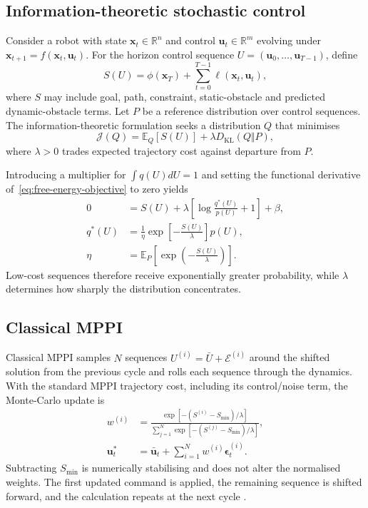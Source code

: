 \documentclass[journal]{IEEEtran}
\begin{document}
\subsection{Information-theoretic stochastic control}
Consider a robot with state $\mathbf{x}_t\in\mathbb R^n$ and control
$\mathbf{u}_t\in\mathbb R^m$ evolving under
$\mathbf{x}_{t+1}=f(\mathbf{x}_t,\mathbf{u}_t)$. For the horizon control
sequence $U=(\mathbf u_0,\ldots,\mathbf u_{T-1})$, define
\begin{equation}
 S(U)=\phi(\mathbf x_T)+\sum_{t=0}^{T-1}
 \ell(\mathbf x_t,\mathbf u_t),
 \label{eq:trajectory-cost}
\end{equation}
where $S$ may include goal, path, constraint, static-obstacle and predicted
dynamic-obstacle terms. Let $P$ be a reference distribution over control
sequences. The information-theoretic formulation seeks a distribution $Q$
that minimises
\begin{equation}
 \mathcal J(Q)=\mathbb E_Q[S(U)]+\lambda D_{\mathrm{KL}}(Q\Vert P),
 \label{eq:free-energy-objective}
\end{equation}
where $\lambda>0$ trades expected trajectory cost against departure from $P$.

Introducing a multiplier for $\int q(U)dU=1$ and setting the functional
derivative of~\eqref{eq:free-energy-objective} to zero yields
\begin{align}
 0&=S(U)+\lambda\left[\log\frac{q^*(U)}{p(U)}+1\right]+\beta,\\
 q^*(U)&=\frac{1}{\eta}\exp\!\left[-\frac{S(U)}{\lambda}\right]p(U),
 \label{eq:optimal-control-distribution}\\
 \eta&=\mathbb E_P\!\left[\exp\!\left(-\frac{S(U)}{\lambda}\right)\right].
\end{align}
Low-cost sequences therefore receive exponentially greater probability, while
$\lambda$ determines how sharply the distribution concentrates.

\subsection{Classical MPPI}
Classical MPPI samples $N$ sequences
$U^{(i)}=\bar U+\mathcal E^{(i)}$ around the shifted solution from the previous
cycle and rolls each sequence through the dynamics. With the standard MPPI
trajectory cost, including its control/noise term, the Monte-Carlo update is
\begin{align}
  w^{(i)}
  &=\frac{\exp[-(S^{(i)}-S_{\min})/\lambda]}
          {\sum_{j=1}^{N}\exp[-(S^{(j)}-S_{\min})/\lambda]},\\
  \mathbf{u}^{*}_t
  &=\bar{\mathbf u}_t+
    \sum_{i=1}^{N} w^{(i)}\boldsymbol\epsilon^{(i)}_t .
  \label{eq:mppi}
\end{align}
Subtracting $S_{\min}$ is numerically stabilising and does not alter the
normalised weights. The first updated command is applied, the remaining
sequence is shifted forward, and the calculation repeats at the next cycle
\cite{williams2017mppi,williams2018mppi}.
\end{document}

